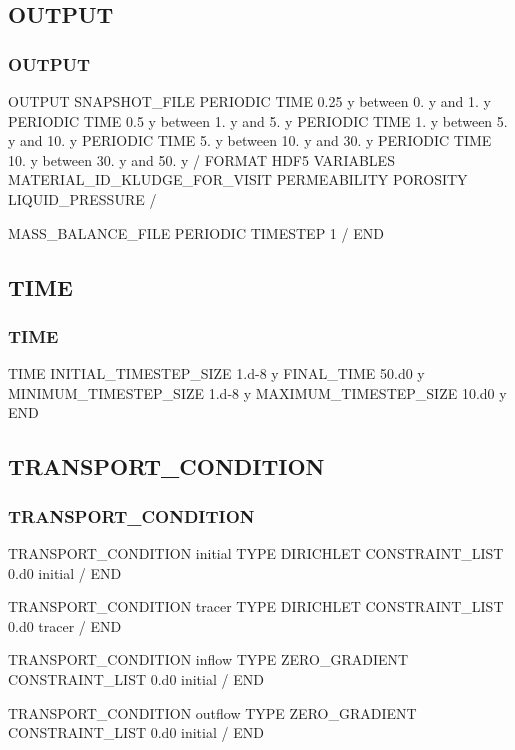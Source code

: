 \documentclass{beamer}
\begin{document}
\subsection{OUTPUT}
\begin{frame}\frametitle{OUTPUT}
	
	\begin{semiverbatim}
OUTPUT
  SNAPSHOT_FILE
    PERIODIC TIME 0.25 y between 0. y and 1. y
    PERIODIC TIME 0.5 y between 1. y and 5. y
    PERIODIC TIME 1. y between 5. y and 10. y
    PERIODIC TIME 5. y between 10. y and 30. y
    PERIODIC TIME 10. y between 30. y and 50. y
  /
  FORMAT HDF5
  VARIABLES
    MATERIAL_ID_KLUDGE_FOR_VISIT
    PERMEABILITY
    POROSITY
    LIQUID_PRESSURE
  /
  
  
  
  MASS_BALANCE_FILE
    PERIODIC TIMESTEP 1
  /
END
\end{semiverbatim}
\end{frame}


\subsection{TIME}
\begin{frame}\frametitle{TIME}
	
	\begin{semiverbatim}
		TIME
		  INITIAL_TIMESTEP_SIZE  1.d-8 y
		  FINAL_TIME 50.d0 y
		  MINIMUM_TIMESTEP_SIZE  1.d-8 y
		  MAXIMUM_TIMESTEP_SIZE 10.d0 y
		END
	\end{semiverbatim}
	
\end{frame}


\subsection{TRANSPORT\_CONDITION}
\begin{frame}\frametitle{TRANSPORT\_CONDITION}
	
	\begin{semiverbatim}
TRANSPORT_CONDITION initial
  TYPE DIRICHLET
  CONSTRAINT_LIST
    0.d0 initial
  /
END

TRANSPORT_CONDITION tracer
  TYPE DIRICHLET
  CONSTRAINT_LIST
    0.d0 tracer
  /
END



TRANSPORT_CONDITION inflow
  TYPE ZERO_GRADIENT
  CONSTRAINT_LIST
    0.d0 initial
  /
END

TRANSPORT_CONDITION outflow
  TYPE ZERO_GRADIENT
  CONSTRAINT_LIST
    0.d0 initial
  /
END
	\end{semiverbatim}
	
\end{frame}
\end{document}
